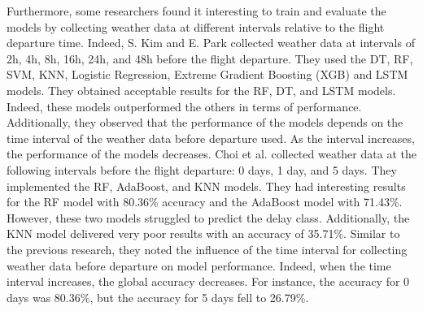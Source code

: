 \documentclass[12pt,oneside]{book} %
\begin{document}
\noindent Furthermore, some researchers found it interesting to train and evaluate the models by collecting weather data at different intervals relative to the flight departure time. Indeed, S. Kim and E. Park \cite{kim} collected weather data at intervals of 2h, 4h, 8h, 16h, 24h, and 48h before the flight departure. They used the DT, RF, SVM, KNN, Logistic Regression, Extreme Gradient Boosting (XGB) and LSTM models. They obtained acceptable results for the RF, DT, and LSTM models. Indeed, these models outperformed the others in terms of performance. Additionally, they observed that the performance of the models depends on the time interval of the weather data before departure used. As the interval increases, the performance of the models decreases. Choi et al. \cite{choi} collected weather data at the following intervals before the flight departure: 0 days, 1 day, and 5 days. They implemented the RF, AdaBoost, and KNN models. They had interesting results for the RF model with 80.36\% accuracy and the AdaBoost model with 71.43\%. However, these two models struggled to predict the delay class. Additionally, the KNN model delivered very poor results with an accuracy of 35.71\%. Similar to the previous research, they noted the influence of the time interval for collecting weather data before departure on model performance. Indeed, when the time interval increases, the global accuracy decreases. For instance, the accuracy for 0 days was 80.36\%, but the accuracy for 5 days fell to 26.79\%.
\end{document}
